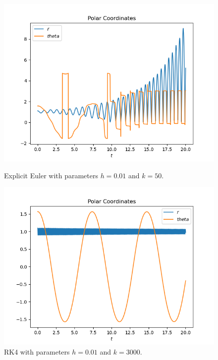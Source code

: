 \documentclass{report}
\begin{document}
\begin{figure}[h]
\centering
\begin{minipage}[t]{0.45\textwidth}
\centering
\includegraphics[width=\textwidth]{../Plots/ExpEuler/exp_euler_k=50_h=0.01_c}
\caption{Explicit Euler with parameters $h=0.01$ and $k=50$.}
\label{exp_euler_k=50_h=0.01_c}
\end{minipage}
\hfill
\begin{minipage}[t]{0.45\textwidth}
\centering
\includegraphics[width=\textwidth]{../Plots/RK4/rk4_h=0.01_k=3000_c}
\caption{RK4 with parameters $h=0.01$ and $k=3000$.}
\label{rk4_h=0.01_k=3000_c}
\end{minipage}
\end{figure}
\end{document}
